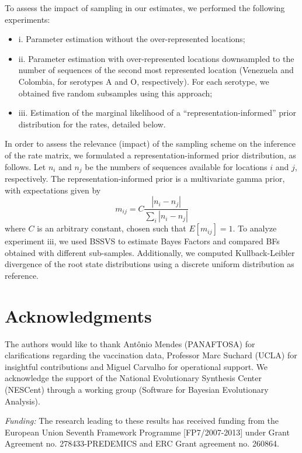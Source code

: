 \documentclass[10pt]{article}
\begin{document}
To assess the impact of sampling in our estimates, we performed the following experiments:
\begin{itemize}
 \item i. Parameter estimation without the over-represented locations;
 \item ii. Parameter estimation with over-represented locations downsampled to the number of sequences of the second most represented location (Venezuela and Colombia, for serotypes A and O, respectively). For each serotype, we obtained five random subsamples using this approach;
 \item iii. Estimation of the marginal likelihood of a ``representation-informed'' prior distribution for the rates, detailed below.
\end{itemize}

In order to assess the relevance (impact) of the sampling scheme on the inference of the rate matrix, we formulated a representation-informed prior distribution, as follows. Let $n_i$ and $n_j$ be the numbers of sequences available for locations $i$ and $j$, respectively. The representation-informed prior is a multivariate gamma prior, with expectations given by
\begin{equation}
 m_{ij}=C\frac{|n_i-n_j|}{\sum_i|n_i-n_j|}
\end{equation}
where $C$ is an arbitrary constant, chosen such that $E[m_{ij}]=1$. To analyze experiment iii, we used BSSVS to estimate Bayes Factors and compared BFs obtained with different sub-samples. Additionally, we computed Kullback-Leibler divergence \cite{KL,roots} of the root state distributions using a discrete uniform distribution as reference. 


\section*{Acknowledgments}
The authors would like to thank Ant\^onio Mendes (PANAFTOSA) for clarifications regarding the vaccination data, Professor Marc Suchard (UCLA) for insightful contributions and Miguel Carvalho for operational support.
We acknowledge the support of the National Evolutionary Synthesis Center (NESCent) through a working group (Software for Bayesian Evolutionary Analysis).

\emph{Funding:} The research leading to these results has received funding from the European Union Seventh Framework Programme [FP7/2007-2013] under Grant Agreement no. 278433-PREDEMICS and ERC Grant agreement no. 260864.
\end{document}
